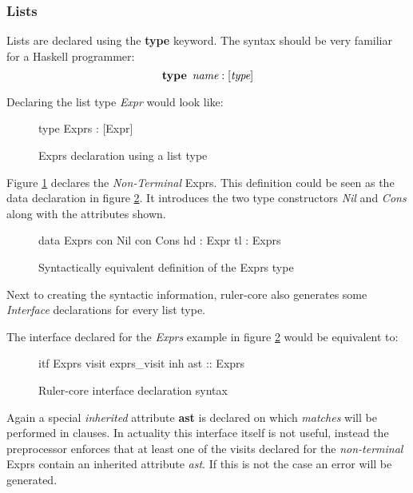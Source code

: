 \subsubsection{Lists}
Lists are declared using the \textbf{type} keyword. The syntax should be very familiar for a Haskell programmer: \[ \textbf{type} \hspace{5pt} \emph{name} : [\emph{type}] \]

Declaring the list type \emph{Expr} would look like:

\begin{figure}[H]
\begin{code}
type Exprs : [Expr]
\end{code}
\caption{Exprs declaration using a list type}
\label{type:exprs}
\end{figure}

Figure \ref{type:exprs} declares the \emph{Non-Terminal} Exprs. This definition could be seen as the data declaration in figure \ref{type:lists}. It introduces the two type constructors \emph{Nil} and \emph{Cons} along with the attributes shown.

\begin{figure}[H]
\begin{code}
data Exprs
  con Nil
  con Cons
    hd : Expr
    tl : Exprs
\end{code}
\caption{Syntactically equivalent definition of the Exprs type}
\label{type:lists}
\end{figure}

Next to creating the syntactic information, ruler-core also generates some \emph{Interface} declarations for every list type. 

The interface declared for the \emph{Exprs} example in figure \ref{type:lists} would be equivalent to:

\begin{figure}[h!]
\begin{code}
itf Exprs
  visit exprs_visit
    inh ast :: Exprs
\end{code}
\caption{Ruler-core interface declaration syntax}
\label{itf:exprs}
\end{figure}

Again a special \emph{inherited} attribute \textbf{ast} is declared on which \emph{matches} will be performed in clauses. In actuality this interface itself is not useful, instead the preprocessor enforces that at least one of the visits declared for the \emph{non-terminal} Exprs contain an inherited attribute \emph{ast}. If this is not the case an error will be generated.

